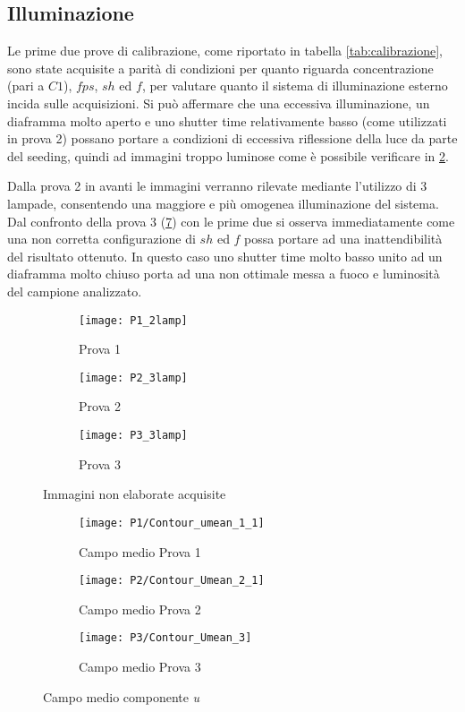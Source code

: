 \documentclass{article} %
\begin{document}
\subsection{Illuminazione}
Le prime due prove di calibrazione, come riportato in tabella \ref{tab:calibrazione}, sono state acquisite a parità di condizioni per quanto riguarda concentrazione (pari a $C1$), $fps$, $sh$ ed $f$, per valutare quanto il sistema di illuminazione esterno incida sulle acquisizioni. Si può affermare che una eccessiva illuminazione, un diaframma molto aperto e uno shutter time relativamente basso (come utilizzati in prova 2) possano portare a condizioni di eccessiva riflessione della luce da parte del seeding, quindi ad immagini troppo luminose come è possibile verificare in \cref{fig:imm_p2}.\par
Dalla prova 2 in avanti le immagini verranno rilevate mediante l'utilizzo di 3 lampade, consentendo una maggiore e più omogenea illuminazione del sistema. Dal confronto della prova 3 (\cref{fig:cm_p3}) con le prime due si osserva immediatamente come una non corretta configurazione di $sh$ ed $f$ possa portare ad una inattendibilità del risultato ottenuto. In questo caso uno shutter time molto basso unito ad un diaframma molto chiuso porta ad una non ottimale messa a fuoco e luminosità del campione analizzato.\par
\begin{figure}[!ht]
	\centering
	\begin{subfigure}{0.3\textwidth}
		\texttt{[image: P1\_2lamp]}
		\caption{Prova 1}
		\label{fig:imm_p1}
	\end{subfigure} \quad
	\begin{subfigure}{0.3\textwidth}
		\texttt{[image: P2\_3lamp]}
		\caption{Prova 2}
		\label{fig:imm_p2}
	\end{subfigure} \quad
	\begin{subfigure}{0.3\textwidth}
		\texttt{[image: P3\_3lamp]}
		\caption{Prova 3}
		\label{fig:imm_p3}	
	\end{subfigure} 	
	\caption{Immagini non elaborate acquisite}
	\label{fig:imm_P123}
\end{figure}
\begin{figure}[!ht]
	\centering
	\begin{subfigure}{0.3\textwidth}
		\texttt{[image: P1/Contour\_umean\_1\_1]}
		\caption{Campo medio Prova 1}
		\label{fig:cm_p1}
	\end{subfigure} \quad
	\begin{subfigure}{0.3\textwidth}
		\texttt{[image: P2/Contour\_Umean\_2\_1]}
		\caption{Campo medio Prova 2}
		\label{fig:cm_p2}
	\end{subfigure} \quad  
	\begin{subfigure}{0.3\textwidth}
		\texttt{[image: P3/Contour\_Umean\_3]}
		\caption{Campo medio Prova 3}
		\label{fig:cm_p3}	
	\end{subfigure} 	
	\caption{Campo medio componente \textit{u}}
	\label{fig:icm_P123}
\end{figure}
\clearpage
\end{document}
